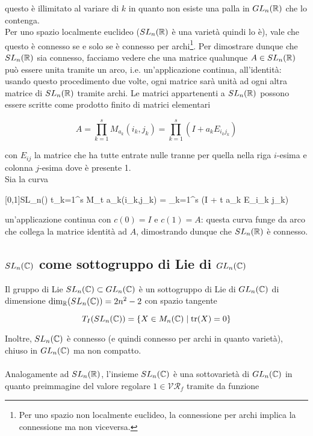 questo è illimitato al variare di $ k $ in quanto non esiste una palla in $ GL_{n}(\mathbb{R}) $ che lo contenga.\\
Per uno spazio localmente euclideo ($ SL_{n}(\mathbb{R}) $ è una varietà quindi lo è), vale che questo è connesso se e solo se è connesso per archi\footnote{%
	Per uno spazio non localmente euclideo, la connessione per archi implica la connessione ma non viceversa.%
}. Per dimostrare dunque che $ SL_{n}(\mathbb{R}) $ sia connesso, facciamo vedere che una matrice qualunque $ A \in SL_{n}(\mathbb{R}) $ può essere unita tramite un arco, i.e. un'applicazione continua, all'identità: usando questo procedimento due volte, ogni matrice sarà unità ad ogni altra matrice di $ SL_{n}(\mathbb{R}) $ tramite archi. Le matrici appartenenti a $ SL_{n}(\mathbb{R}) $ possono essere scritte come prodotto finito di matrici elementari

\begin{equation}
	A = \prod_{k=1}^{s} M_{a_{k}}(i_{k},j_{k}) = \prod_{k=1}^{s} (I + a_{k} E_{i_{k} j_{k}})
\end{equation}

con $ E_{ij} $ la matrice che ha tutte entrate nulle tranne per quella nella riga $ i $-esima e colonna $ j $-esima dove è presente 1.\\
Sia la curva

%
	{[0,1]}{SL_{n}(\R)}%
	{t}{\prod_{k=1}^{s} M_{t a_{k}}(i_{k},j_{k}) = \prod_{k=1}^{s} (I + t a_{k} E_{i_{k} j_{k}})}
	
un'applicazione continua con $ c(0) = I $ e $ c(1) = A $: questa curva funge da arco che collega la matrice identità ad $ A $, dimostrando dunque che $ SL_{n}(\mathbb{R}) $ è connesso.

\subsection{$ SL_{n}(\mathbb{C}) $ come sottogruppo di Lie di $ GL_{n}(\mathbb{C}) $}

Il gruppo di Lie $ SL_{n}(\mathbb{C}) \subset GL_{n}(\mathbb{C}) $ è un sottogruppo di Lie di $ GL_{n}(\mathbb{C}) $ di dimensione $ \dim_{\mathbb{R}}(SL_{n}(\mathbb{C})) = 2 n^{2} - 2 $ con spazio tangente

\begin{equation}
	T_{I}(SL_{n}(\mathbb{C})) = \{ X \in M_{n}(\mathbb{C}) \mid \tr(X) = 0 \}
\end{equation}

Inoltre, $ SL_{n}(\mathbb{C}) $ è connesso (e quindi connesso per archi in quanto varietà), chiuso in $ GL_{n}(\mathbb{C}) $ ma non compatto.\\\\
Analogamente ad $ SL_{n}(\mathbb{R}) $, l'insieme $ SL_{n}(\mathbb{C}) $ è una sottovarietà di $ GL_{n}(\mathbb{C}) $ in quanto preimmagine del valore regolare $ 1 \in \mathcal{VR}_{f} $ tramite da funzione

